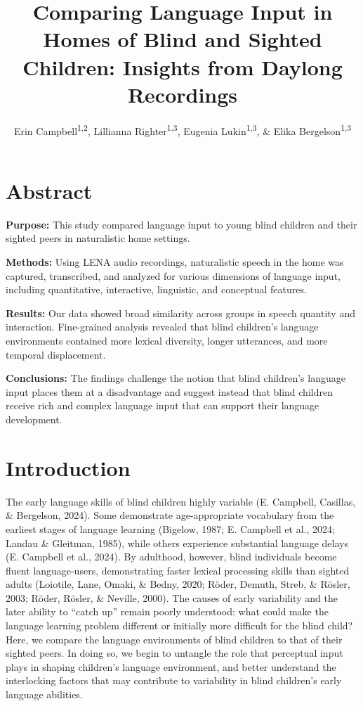 \documentclass[
  man]{apa6}
\title{Comparing Language Input in Homes of Blind and Sighted Children: Insights from Daylong Recordings}
\author{Erin Campbell\textsuperscript{1,2}, Lillianna Righter\textsuperscript{1,3}, Eugenia Lukin\textsuperscript{1,3}, \& Elika Bergelson\textsuperscript{1,3}}
\date{}
\affiliation{\vspace{0.5cm}\textsuperscript{1} Department of Psychology \& Neuroscience, Duke University, Durham, NC\\\textsuperscript{2} Wheelock College of Education \& Human Development, Boston University, Boston, MA\\\textsuperscript{3} Department of Psychology, Harvard University, Boston, MA}
\begin{document}
\maketitle

\hypertarget{abstract}{%
\section{Abstract}\label{abstract}}

\textbf{Purpose:} This study compared language input to young blind children and their sighted peers in naturalistic home settings.

\textbf{Methods:} Using LENA audio recordings, naturalistic speech in the home was captured, transcribed, and analyzed for various dimensions of language input, including quantitative, interactive, linguistic, and conceptual features.

\textbf{Results:} Our data showed broad similarity across groups in speech quantity and interaction. Fine-grained analysis revealed that blind children's language environments contained more lexical diversity, longer utterances, and more temporal displacement.

\textbf{Conclusions:} The findings challenge the notion that blind children's language input places them at a disadvantage and suggest instead that blind children receive rich and complex language input that can support their language development.

\hypertarget{introduction}{%
\section{Introduction}\label{introduction}}

The early language skills of blind children highly variable (E. Campbell, Casillas, \& Bergelson, 2024). Some demonstrate age-appropriate vocabulary from the earliest stages of language learning (Bigelow, 1987; E. Campbell et al., 2024; Landau \& Gleitman, 1985), while others experience substantial language delays (E. Campbell et al., 2024). By adulthood, however, blind individuals become fluent language-users, demonstrating faster lexical processing skills than sighted adults (Loiotile, Lane, Omaki, \& Bedny, 2020; Röder, Demuth, Streb, \& Rösler, 2003; Röder, Rösler, \& Neville, 2000). The causes of early variability and the later ability to ``catch up'' remain poorly understood: what could make the language learning problem different or initially more difficult for the blind child? Here, we compare the language environments of blind children to that of their sighted peers. In doing so, we begin to untangle the role that perceptual input plays in shaping children's language environment, and better understand the interlocking factors that may contribute to variability in blind children's early language abilities.
\end{document}
